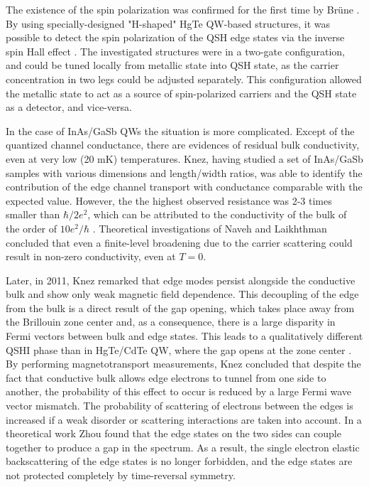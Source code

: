 \documentclass[titlepage,a4paper]{book}
\begin{document}
The existence of the spin polarization was confirmed for the first time by Brüne \cite{Brune_State}. By using specially-designed "H-shaped" HgTe QW-based structures, it was possible to detect the spin polarization of the QSH edge states via the inverse spin Hall effect \cite{Hankiewicz_State}\cite{Valenzuela_State}. The investigated structures were in a two-gate configuration, and could be tuned locally from metallic state into QSH state, as the carrier concentration in two legs could be adjusted separately. This configuration allowed the metallic state to act as a source of spin-polarized carriers and the QSH state as a detector, and vice-versa. 

In the case of InAs/GaSb QWs the situation is more complicated. Except of the quantized channel conductance, there are evidences of residual bulk conductivity, even at very low (20 mK) temperatures. Knez, having studied a set of InAs/GaSb samples with various dimensions and length/width ratios, was able to identify the contribution of the edge channel transport with conductance comparable with the expected value. However, the the highest observed resistance was 2-3 times smaller than $\hbar/2e^2$, which can be attributed to the conductivity of the bulk of the order of $10 e^2/ \hbar$ \cite{Knez1_State}. Theoretical investigations of Naveh and Laikhthman \cite{Naveh_State} concluded that even a finite-level broadening due to the carrier scattering could result in non-zero conductivity, even at $T = 0$.  

Later, in 2011, Knez remarked that edge modes persist alongside the conductive bulk and show only weak magnetic field dependence. This decoupling of the edge from the bulk is a direct result of the gap opening, which takes place away from the Brillouin zone center and, as a consequence, there is a large disparity in Fermi vectors between bulk and edge states. This leads to a qualitatively different QSHI phase than in HgTe/CdTe QW, where the gap opens at the zone center \cite{Knez2_State}. By performing magnetotransport measurements, Knez concluded that despite the fact that conductive bulk allows edge electrons to tunnel from one side to another, the probability of this effect to occur is reduced by a large Fermi wave vector mismatch. The probability of scattering of electrons between the edges is increased if a weak disorder or scattering interactions are taken into account. In a theoretical work Zhou \cite{Zhou_State} found that the edge states on the two sides can couple together to produce a gap in the spectrum. As a result, the single electron elastic backscattering of the edge states is no longer forbidden, and the edge states are not protected completely by time-reversal symmetry. 
\end{document}
